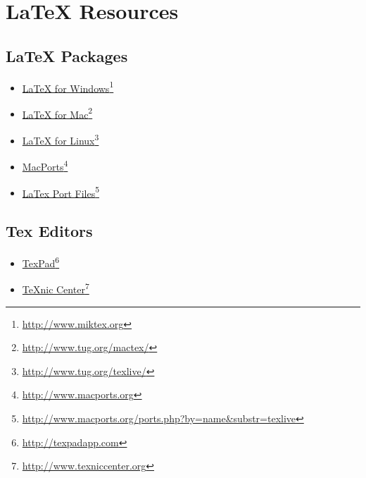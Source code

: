 
\section{LaTeX Resources}

\subsection{LaTeX Packages}
\label{latexpackages}

\begin{itemize}
\item \href{http://www.miktex.org}{LaTeX for Windows}\footnote{\href{http://www.miktex.org}{http:/\slash www.miktex.org}}

\item \href{http://www.tug.org/mactex/}{LaTeX for Mac}\footnote{\href{http://www.tug.org/mactex/}{http:/\slash www.tug.org\slash mactex\slash }}

\item \href{http://www.tug.org/texlive/}{LaTeX for Linux}\footnote{\href{http://www.tug.org/texlive/}{http:/\slash www.tug.org\slash texlive\slash }}

\item \href{http://www.macports.org}{MacPorts}\footnote{\href{http://www.macports.org}{http:/\slash www.macports.org}}

\item \href{http://www.macports.org/ports.php?by=name&substr=texlive}{LaTex Port Files}\footnote{\href{http://www.macports.org/ports.php?by=name&substr=texlive}{http:/\slash www.macports.org\slash ports.php?by=name\&substr=texlive}}

\end{itemize}

\subsection{Tex Editors}
\label{texeditor}

\begin{itemize}
\item \href{http://texpadapp.com}{TexPad}\footnote{\href{http://texpadapp.com}{http:/\slash texpadapp.com}}

\item \href{http://www.texniccenter.org}{TeXnic Center}\footnote{\href{http://www.texniccenter.org}{http:/\slash www.texniccenter.org}}

\end{itemize}

